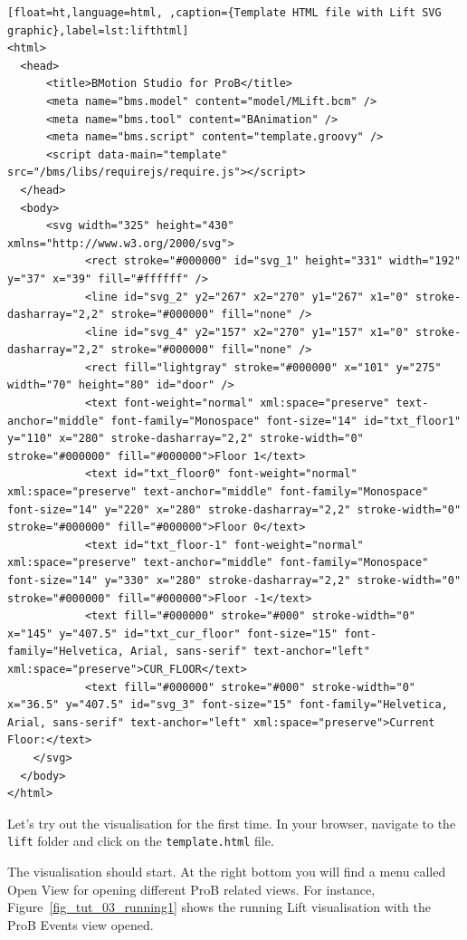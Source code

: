 \begin{lstlisting}[float=ht,language=html, ,caption={Template HTML file with Lift SVG graphic},label=lst:lifthtml]
<html>
  <head>
      <title>BMotion Studio for ProB</title>
      <meta name="bms.model" content="model/MLift.bcm" />
      <meta name="bms.tool" content="BAnimation" />
      <meta name="bms.script" content="template.groovy" />
      <script data-main="template" src="/bms/libs/requirejs/require.js"></script>
  </head>
  <body>
      <svg width="325" height="430" xmlns="http://www.w3.org/2000/svg">
            <rect stroke="#000000" id="svg_1" height="331" width="192" y="37" x="39" fill="#ffffff" />
            <line id="svg_2" y2="267" x2="270" y1="267" x1="0" stroke-dasharray="2,2" stroke="#000000" fill="none" />
            <line id="svg_4" y2="157" x2="270" y1="157" x1="0" stroke-dasharray="2,2" stroke="#000000" fill="none" />
            <rect fill="lightgray" stroke="#000000" x="101" y="275" width="70" height="80" id="door" />
            <text font-weight="normal" xml:space="preserve" text-anchor="middle" font-family="Monospace" font-size="14" id="txt_floor1" y="110" x="280" stroke-dasharray="2,2" stroke-width="0" stroke="#000000" fill="#000000">Floor 1</text>
            <text id="txt_floor0" font-weight="normal" xml:space="preserve" text-anchor="middle" font-family="Monospace" font-size="14" y="220" x="280" stroke-dasharray="2,2" stroke-width="0" stroke="#000000" fill="#000000">Floor 0</text>
            <text id="txt_floor-1" font-weight="normal" xml:space="preserve" text-anchor="middle" font-family="Monospace" font-size="14" y="330" x="280" stroke-dasharray="2,2" stroke-width="0" stroke="#000000" fill="#000000">Floor -1</text>
            <text fill="#000000" stroke="#000" stroke-width="0" x="145" y="407.5" id="txt_cur_floor" font-size="15" font-family="Helvetica, Arial, sans-serif" text-anchor="left" xml:space="preserve">CUR_FLOOR</text>
            <text fill="#000000" stroke="#000" stroke-width="0" x="36.5" y="407.5" id="svg_3" font-size="15" font-family="Helvetica, Arial, sans-serif" text-anchor="left" xml:space="preserve">Current Floor:</text>
    </svg>
  </body>
</html>
\end{lstlisting}

Let's try out the visualisation for the first time.
In your browser, navigate to the \texttt{lift} folder and click on the \texttt{template.html} file.

The visualisation should start.
At the right bottom you will find a menu called \textsf{Open View} for opening different ProB related views.
For instance, Figure~\ref{fig_tut_03_running1} shows the running Lift visualisation with the ProB Events view opened.

